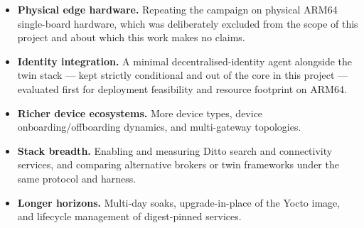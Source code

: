 \begin{itemize}
  \item \textbf{Physical edge hardware.} Repeating the campaign on physical
        ARM64 single-board hardware, which was deliberately excluded from the
        scope of this project and about which this work makes no claims.
  \item \textbf{Identity integration.} A minimal decentralised-identity agent
        alongside the twin stack --- kept strictly conditional and out of the
        core in this project --- evaluated first for deployment feasibility
        and resource footprint on ARM64.
  \item \textbf{Richer device ecosystems.} More device types, device
        onboarding/offboarding dynamics, and multi-gateway topologies.
  \item \textbf{Stack breadth.} Enabling and measuring Ditto search and
        connectivity services, and comparing alternative brokers or twin
        frameworks under the same protocol and harness.
  \item \textbf{Longer horizons.} Multi-day soaks, upgrade-in-place of the
        Yocto image, and lifecycle management of digest-pinned services.
\end{itemize}
